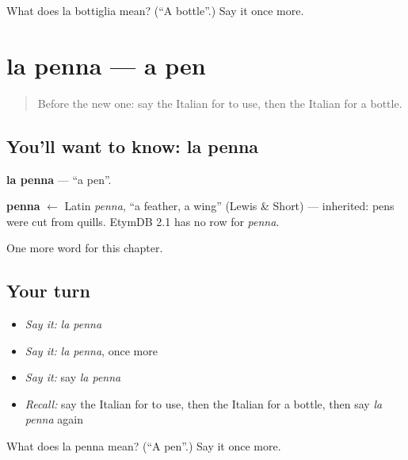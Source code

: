 \begin{tcolorbox}[breakable,colback=teal!4,colframe=teal!35!black,title={Before you move on}]
What does la bottiglia mean? (\textquotedblleft{}A bottle\textquotedblright{}.) Say it once more.
\end{tcolorbox}
\section[la penna]{la penna — a pen}

\label{lesson:IT-C61-penna}



\begin{quote}
Before the new one: say the Italian for to use, then the Italian for a bottle.
\end{quote}

\subsection*{You'll want to know: la penna}
\textbf{la penna} — \textquotedblleft{}a pen\textquotedblright{}.

\begin{cousinweb}
\textbf{penna} $\leftarrow$ Latin \emph{penna}, \textquotedblleft{}a feather, a wing\textquotedblright{} (Lewis \& Short) — inherited: pens were cut from quills. EtymDB 2.1 has no row for \emph{penna}.
\end{cousinweb}

\begin{grammarlens}[title={What you've built}]
One more word for this chapter.
\end{grammarlens}

\subsection*{Your turn}
\begin{itemize}
\raggedright
  \item \emph{Say it:} \emph{la penna}
  \item \emph{Say it:} \emph{la penna}, once more
  \item \emph{Say it:} say \emph{la penna}
  \item \emph{Recall:} say the Italian for to use, then the Italian for a bottle, then say \emph{la penna} again
\end{itemize}

\begin{tcolorbox}[breakable,colback=teal!4,colframe=teal!35!black,title={Before you move on}]
What does la penna mean? (\textquotedblleft{}A pen\textquotedblright{}.) Say it once more.
\end{tcolorbox}
